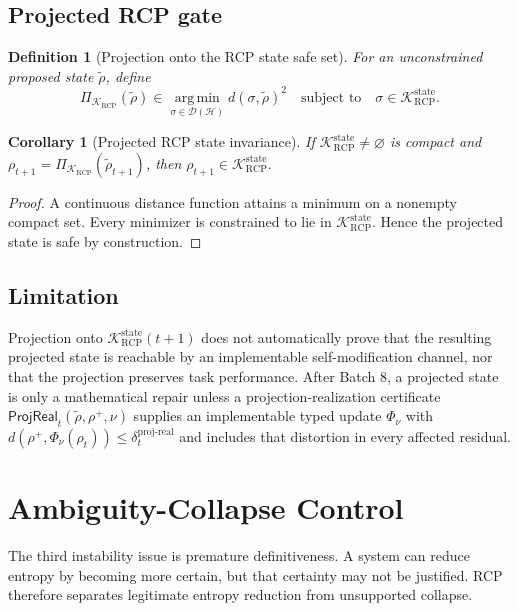 \documentclass[11pt]{article}
\newtheorem{corollary}[theorem]{Corollary}
\newtheorem{definition}[theorem]{Definition}
\newcommand{\D}{\mathcal{D}}
\newcommand{\Hcal}{\mathcal{H}}
\newcommand{\K}{\mathcal{K}}
\newcommand{\argmin}{\operatorname*{arg\,min}}
\newcommand{\1}{\mathbf{1}}
\newcommand{\RCP}{\mathrm{RCP}}
\newcommand{\state}{\mathrm{state}}
\providecommand{\proj}{\mathrm{proj}}
\providecommand{\real}{\mathrm{real}}
\begin{document}
\subsection{Projected RCP gate}

\begin{definition}[Projection onto the RCP state safe set]
For an unconstrained proposed state \(\tilde\rho\), define
\[
\Pi_{\K_{\RCP}}(\tilde\rho)
\in
\argmin_{\sigma\in\D(\Hcal)} d(\sigma,\tilde\rho)^2
\quad\text{subject to}\quad
\sigma\in\K_{\RCP}^{\state}.
\]
\end{definition}

\begin{corollary}[Projected RCP state invariance]
If \(\K_{\RCP}^{\state}\ne\varnothing\) is compact and \(\rho_{t+1}=\Pi_{\K_{\RCP}}(\tilde\rho_{t+1})\), then \(\rho_{t+1}\in\K_{\RCP}^{\state}\).
\end{corollary}

\begin{proof}
A continuous distance function attains a minimum on a nonempty compact set. Every minimizer is constrained to lie in \(\K_{\RCP}^{\state}\). Hence the projected state is safe by construction.
\end{proof}

\subsection{Limitation}

Projection onto \(\K_{\RCP}^{\state}(t+1)\) does not automatically prove that the resulting projected state is reachable by an implementable self-modification channel, nor that the projection preserves task performance. After Batch 8, a projected state is only a mathematical repair unless a projection-realization certificate \(\mathsf{ProjReal}_t(\tilde\rho,\rho^+,\nu)\) supplies an implementable typed update \(\Phi_\nu\) with \(d(\rho^+,\Phi_\nu(\rho_t))\le\delta_t^{\proj\mbox{-}\real}\) and includes that distortion in every affected residual.

\section{Ambiguity-Collapse Control}

The third instability issue is premature definitiveness. A system can reduce entropy by becoming more certain, but that certainty may not be justified. RCP therefore separates legitimate entropy reduction from unsupported collapse.
\end{document}
